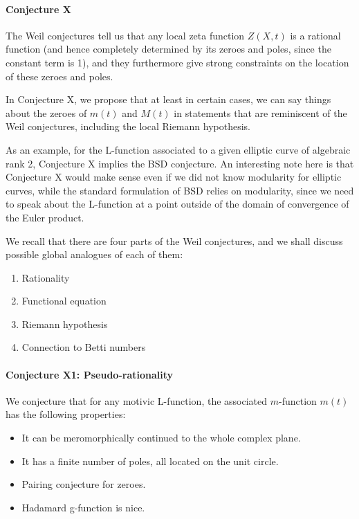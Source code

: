 \documentclass[paper=a4, fontsize=11pt]{scrartcl} %
\numberwithin{equation}{section} %
\numberwithin{figure}{section} %
\numberwithin{table}{section} %
\begin{document}
\paragraph{Conjecture X}

The Weil conjectures tell us that any local zeta function $Z(X, t)$ is a rational function (and hence completely determined by its zeroes and poles, since the constant term is 1), and they furthermore give strong constraints on the location of these zeroes and poles.

In Conjecture X, we propose that at least in certain cases, we can say things about the zeroes of $m(t)$ and $M(t)$ in statements that are reminiscent of the Weil conjectures, including the local Riemann hypothesis.

As an example, for the L-function associated to a given elliptic curve of algebraic rank 2, Conjecture X implies the BSD conjecture. An interesting note here is that Conjecture X would make sense even if we did not know modularity for elliptic curves, while the standard formulation of BSD relies on modularity, since we need to speak about the L-function at a point outside of the domain of convergence of the Euler product.

We recall that there are four parts of the Weil conjectures, and we shall discuss possible global analogues of each of them:

\begin{enumerate}
\item Rationality
\item Functional equation
\item Riemann hypothesis
\item Connection to Betti numbers
\end{enumerate}

\paragraph{Conjecture X1: Pseudo-rationality}

We conjecture that for any motivic L-function, the associated $m$-function $m(t)$ has the following properties:
\begin{itemize}
\item It can be meromorphically continued to the whole complex plane.
\item It has a finite number of poles, all located on the unit circle.
\item Pairing conjecture for zeroes.
\item Hadamard g-function is nice.
\end{itemize}
\end{document}
